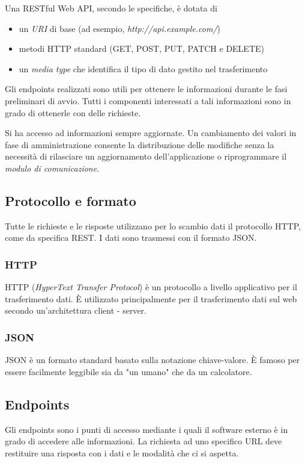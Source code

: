 Una RESTful Web API, secondo le specifiche, è dotata di
\begin{itemize}
    \item un \textit{URI} di base (ad esempio, \textit{http://api.example.com/})
    \item metodi HTTP standard (GET, POST, PUT, PATCH e DELETE)
    \item un \textit{media type} che identifica il tipo di dato gestito nel trasferimento 
\end{itemize}

\noindent Gli endpoints realizzati sono utili per ottenere le informazioni durante le fasi preliminari di avvio.
Tutti i componenti interessati a tali informazioni sono in grado di ottenerle con delle richieste.

Si ha accesso ad informazioni sempre aggiornate. Un cambiamento dei valori in fase di amministrazione consente la 
distribuzione delle modifiche senza la necessità di rilasciare un aggiornamento dell'applicazione o riprogrammare il 
\textit{modulo di comunicazione}.


\subsection{Protocollo e formato}
Tutte le richieste e le risposte utilizzano per lo scambio dati il protocollo HTTP, come da specifica REST.
I dati sono trasmessi con il formato JSON.

\subsubsection{HTTP}
HTTP (\textit{HyperText Transfer Protocol}) è un protocollo a livello applicativo per il trasferimento dati. È utilizzato principalmente 
per il trasferimento dati sul web secondo un'architettura client - server.

\subsubsection{JSON}
JSON \cite{json} è un formato standard basato sulla notazione chiave-valore. È famoso per essere facilmente 
leggibile sia da "un umano" che da un calcolatore.



\subsection{Endpoints}
Gli endpoints sono i punti di accesso mediante i quali il software esterno 
è in grado di accedere alle informazioni. La richiesta ad uno specifico URL 
deve restituire una risposta con i dati e le modalità che ci si aspetta.

